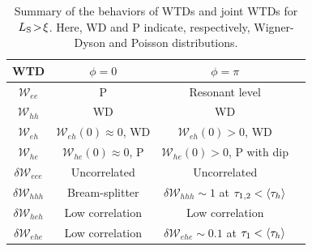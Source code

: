 \documentclass[aps,prl,amsmath,twocolumn,floatfix,superscriptaddress,longbibliography,footinbib]{revtex4-1}
\DeclarePairedDelimiter\mean{\langle}{\rangle}
\begin{document}
\begingroup
\squeezetable
\begin{table}[t!]
	\begin{tabular}{|c|c|c|c|}
		\hline %
		WTD &  $\phi\!=\!0$ &  $\phi\!=\!\pi$ \\ \hline 
		$\mathcal{W}_{ee}$ & P  & Resonant level \\  \hline 
		$\mathcal{W}_{hh}$ & WD  & WD \\ \hline 
		$\mathcal{W}_{eh}$ & $\mathcal{W}_{eh}(0)\approx 0$, WD & $\mathcal{W}_{eh}(0)> 0$, WD  \\ \hline 
		$\mathcal{W}_{he}$ & $\mathcal{W}_{he}(0)\approx 0$, P & $\mathcal{W}_{he}(0)> 0$, P with dip \\ \hline  \hline
		$\delta\mathcal{W}_{eee}$ & Uncorrelated  & Uncorrelated \\  \hline 
		$\delta\mathcal{W}_{hhh}$ & Bream-splitter & $\delta\mathcal{W}_{hhh}\sim 1$ at $\tau_{1,2}<\mean{\tau_h}$ \\  \hline 
		$\delta\mathcal{W}_{heh}$ & Low correlation  & Low correlation \\  \hline 
		$\delta\mathcal{W}_{ehe}$ & Low correlation & $\delta\mathcal{W}_{ehe}\sim0.1$ at $\tau_{1}<\mean{\tau_h}$ \\  \hline 
	\end{tabular}
	\caption{Summary of the behaviors of WTDs and joint WTDs for $L_{\rm S}\!>\!\xi$. Here, WD and P indicate, respectively, Wigner-Dyson and Poisson distributions. }
	\label{tab:WTDs_All}
\end{table}
\endgroup
\end{document}
